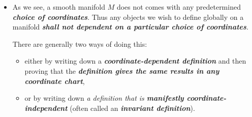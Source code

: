 \documentclass[11pt]{article}
\begin{document}
\begin{itemize}
\item \begin{remark}
As we see, a smooth manifold $M$ does not comes with any predetermined \emph{\textbf{choice of coordinates}}. Thus any objects we wish to define globally on a manifold \emph{\textbf{shall not dependent on a particular choice of coordinates}}.

There are generally two ways of doing this: 
\begin{itemize}
\item either by writing down a \emph{\textbf{coordinate-dependent definition}} and then proving that the \emph{\textbf{definition gives the same results in any coordinate chart}}, 
\item or by writing down \emph{a definition that is \textbf{manifestly coordinate-independent}} (often called an \emph{\textbf{invariant definition}}).
\end{itemize}
\end{remark}
\end{itemize}
\end{document}
